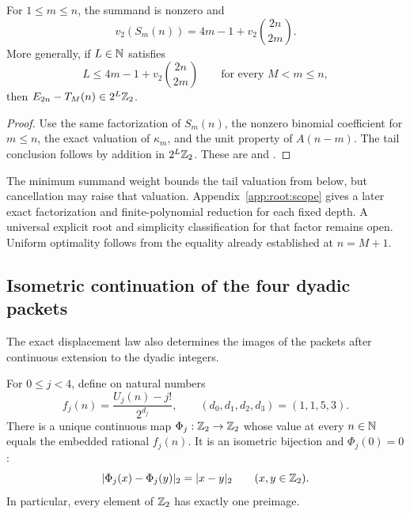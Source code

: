 \begin{proposition}\label{prop:arith-row-weight}
For $1\le m\le n$, the summand is nonzero and
\[
 v_2(S_m(n))=4m-1+v_2\binom{2n}{2m}.
\]
More generally, if $L\in\mathbb N$ satisfies
\[
 L\le4m-1+v_2\binom{2n}{2m}\qquad\text{for every }M<m\le n,
\]
then $E_{2n}-T_M(n)\in2^L\mathbb Z_2$.
\end{proposition}

\begin{proof}
Use the same factorization of $S_m(n)$, the nonzero binomial coefficient
for $m\le n$, the exact valuation of $\kappa_m$, and the unit property
of $A(n-m)$.  The tail conclusion follows by addition in $2^L\mathbb Z_2$.
These are  and
.
\end{proof}

The minimum summand weight bounds the tail valuation from below, but
cancellation may raise that valuation. Appendix~\ref{app:root:scope} gives a later exact factorization and finite-polynomial reduction for each fixed depth. A universal explicit root and simplicity classification for that factor remains open.  Uniform optimality follows
from the equality already established at $n=M+1$.

\subsection{Isometric continuation of the four dyadic packets}

The exact displacement law also determines the images of the packets
after continuous extension to the dyadic integers.

\begin{theorem}\label{thm:arith-isometry}
For $0\le j<4$, define on natural numbers
\[
 f_j(n)=\frac{U_j(n)-j!}{2^{d_j}},\qquad (d_0,d_1,d_2,d_3)=(1,1,5,3).
\]
There is a unique continuous map $\Phi_j:\mathbb Z_2\to\mathbb Z_2$ whose value at
every $n\in\mathbb N$ equals the embedded rational $f_j(n)$.
It is an isometric bijection and $\Phi_j(0)=0$:
\[
 |\Phi_j(x)-\Phi_j(y)|_2=|x-y|_2\qquad(x,y\in\mathbb Z_2).
\]
In particular, every element of $\mathbb Z_2$ has exactly one preimage.
\end{theorem}

